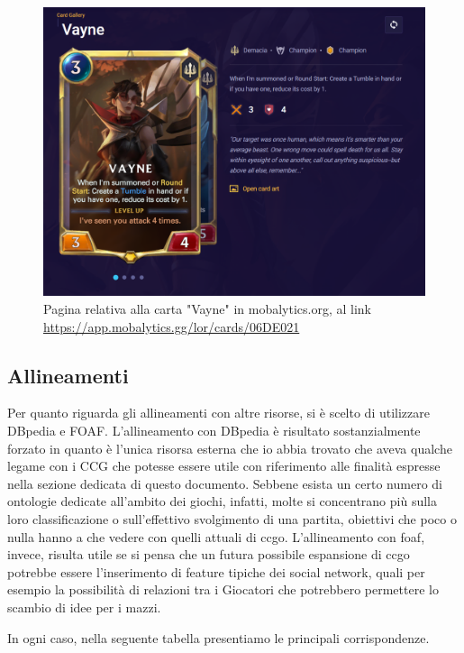 \documentclass[12pt]{article}
\begin{document}
\begin{figure}[H]
    \centering
         \includegraphics[width=13cm]{files/carte_vayne.png}
    \caption{Pagina relativa alla carta "Vayne" in mobalytics.org, al link \url{https://app.mobalytics.gg/lor/cards/06DE021}}
    \label{fig:carte_vayne}
\end{figure}



\subsection{Allineamenti}
Per quanto riguarda gli allineamenti con altre risorse, si è scelto di utilizzare DBpedia e FOAF. L'allineamento con DBpedia è risultato sostanzialmente forzato in quanto è l'unica risorsa esterna che io abbia trovato che aveva qualche legame con i CCG che potesse essere utile con riferimento alle finalità espresse nella sezione dedicata di questo documento. Sebbene esista un certo numero di ontologie dedicate all'ambito dei giochi, infatti, molte si concentrano più sulla loro classificazione o sull'effettivo svolgimento di una partita, obiettivi che poco o nulla hanno a che vedere con quelli attuali di ccgo. \newline
L'allineamento con foaf, invece, risulta utile se si pensa che un futura possibile espansione di ccgo potrebbe essere l'inserimento di feature tipiche dei social network, quali per esempio la possibilità di relazioni tra i Giocatori che potrebbero permettere lo scambio di idee per i mazzi.

In ogni caso, nella seguente tabella presentiamo le principali corrispondenze.
\end{document}
